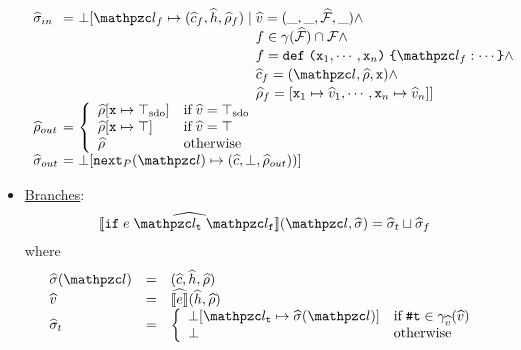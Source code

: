\begin{itemize}
\[\begin{array}{l@{~}c@{~}l}
        \astate_{in} &=& \lhs
        \aval = (\_, \_, \afuncset, \_) \wedge\\

        &&\phantom{\lhs \;}
        \func \in \gamma(\afuncset) \cap \funcset \wedge\\

        &&\phantom{\lhs \;}
        \func = \kwdef \; \kwrl \varx_1, \cdots, \varx_n \kwrr
        \; \kwcl \lab_\func : \cdots \kwcr \wedge\\

        &&\phantom{\lhs \;}
        \actxt_\func = (\lab, \aenv, \varx) \wedge\\

        &&\phantom{\lhs \;}
        \aenv_\func = [\varx_1 \mapsto \aval_1, \cdots,
        \varx_n \mapsto \aval_n] ]\\

        \aenv_{out} &=&
        \left\{
          \begin{array}{ll}
            \aenv[\varx \mapsto \sdotop] & \text{if} \; \aval = \sdotop\\
            \aenv[\varx \mapsto \top] & \text{if} \; \aval = \top\\
            \aenv & \text{otherwise}\\
          \end{array}
        \right.\\

        \astate_{out} &=&
        \bot[\getnext{\prog}(\lab) \mapsto (\actxt, \bot, \aenv_{out}))]

      \end{array}
    \]

  \item \underline{Branches}:
    \[
      \asem{\kwif \; \expr \; \lab_\vart \; \lab_\varf}(\lab, \astate) = \astate_t \join \astate_f
    \]
    where
    \[
      \begin{array}{lcl}
        \astate(\lab) &=& (\actxt, \aheap, \aenv)\\
        \aval &=& \asem{\expr}(\aheap, \aenv)\\

        \astate_t &=& \left\{
          \begin{array}{ll}
            \bot [\lab_\vart \mapsto \astate(\lab)] & \text{if} \; \true \in
            \avalgamma(\aval)\\
            \bot & \text{otherwise}\\
          \end{array}
        \right.\\


\end{array}\]
\end{itemize}
